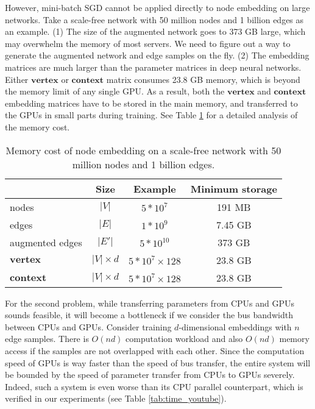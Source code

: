 \documentclass[sigconf]{acmart}
\newcommand{\mat}[1]{\mathbf{#1}}
\begin{document}
However, mini-batch SGD cannot be applied directly to node embedding on large networks. Take a scale-free network with 50 million nodes and 1 billion edges as an example. (1) The size of the augmented network goes to 373 GB large, which may overwhelm the memory of most servers. We need to figure out a way to generate the augmented network and edge samples on the fly. (2) The embedding matrices are much larger than the parameter matrices in deep neural networks. Either $\mat{vertex}$ or $\mat{context}$ matrix consumes 23.8 GB memory, which is beyond the memory limit of any single GPU. As a result, both the $\mat{vertex}$ and $\mat{context}$ embedding matrices have to be stored in the main memory, and transferred to the GPUs in small parts during training. See Table \ref{tab:memory_cost} for a detailed analysis of the memory cost. 

\begin{table}[h]
    \centering
    \begin{adjustbox}{max width=0.48\textwidth}
        \begin{tabular}{lccc}
            \toprule
                                & Size              & Example               & Minimum storage   \\
            \midrule
            nodes               & $|V|$             & $5*10^7$              & 191 MB            \\
            edges               & $|E|$             & $1*10^9$              & 7.45 GB           \\
            augmented edges     & $|E'|$            & $5*10^{10}$           & 373 GB            \\
            $\mat{vertex}$      & $|V| \times d$    & $5*10^7 \times 128$   & 23.8 GB           \\
            $\mat{context}$     & $|V| \times d$    & $5*10^7 \times 128$   & 23.8 GB           \\
            \bottomrule
        \end{tabular}
    \end{adjustbox}
    \caption{Memory cost of node embedding on a scale-free network with 50 million nodes and 1 billion edges.}
    \label{tab:memory_cost}
\end{table}

For the second problem, while transferring parameters from CPUs and GPUs sounds feasible, it will become a bottleneck if we consider the bus bandwidth between CPUs and GPUs. Consider training $d$-dimensional embeddings with $n$ edge samples. There is $O(nd)$ computation workload and also $O(nd)$ memory access if the samples are not overlapped with each other. Since the computation speed of GPUs is way faster than the speed of bus transfer, the entire system will be bounded by the speed of parameter transfer from CPUs to GPUs severely. Indeed, such a system is even worse than its CPU parallel counterpart, which is verified in our experiments (see Table \ref{tab:time_youtube}).
\end{document}
